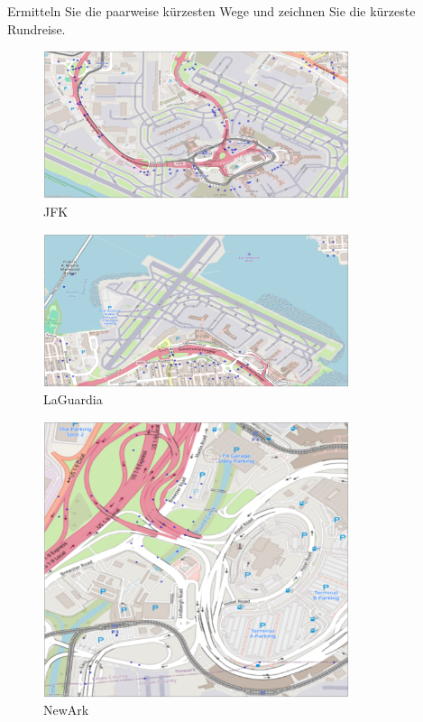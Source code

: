 \documentclass[a4paper,11pt]{report}
\begin{document}
    Ermitteln Sie die paarweise kürzesten Wege und zeichnen Sie die kürzeste Rundreise.

    \begin{figure}[htbp]
        \centering
        \includegraphics[width=0.8\textwidth]{notebooks/assets/aufgabe_06/jfk}
        \caption{JFK}
        \label{fig:jfk}
    \end{figure}

    \begin{figure}[htbp]
        \centering
        \includegraphics[width=0.8\textwidth]{notebooks/assets/aufgabe_06/laguardia}
        \caption{LaGuardia}
        \label{fig:laguardia}
    \end{figure}

    \begin{figure}[htbp]
        \centering
        \includegraphics[width=0.8\textwidth]{notebooks/assets/aufgabe_06/newark}
        \caption{NewArk}
        \label{fig:newark}
    \end{figure}
\end{document}
